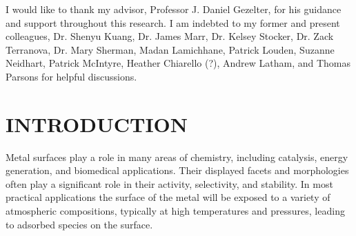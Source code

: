 \documentclass[draft]{nddiss2e}
\begin{document}
\begin{acknowledge}
I would like to thank my advisor, Professor J. Daniel Gezelter, for his
guidance and support throughout this research.
I am indebted to my former and present colleagues, Dr. Shenyu Kuang, Dr. James
Marr, Dr. Kelsey Stocker, Dr. Zack Terranova, Dr. Mary Sherman, Madan
Lamichhane, Patrick Louden, Suzanne Neidhart, Patrick McIntyre, Heather
Chiarello (?), Andrew Latham, and Thomas Parsons for helpful discussions. 
\end{acknowledge}

\mainmatter

\chapter{INTRODUCTION}
Metal surfaces play a role in many areas of chemistry, including catalysis,
energy generation, and biomedical applications. Their displayed facets and
morphologies often play a significant role in their activity, selectivity, and
stability. In most practical applications the surface of the metal will be
exposed to a variety of atmospheric compositions, typically at high
temperatures and pressures, leading to adsorbed species on the surface. 
\end{document}
